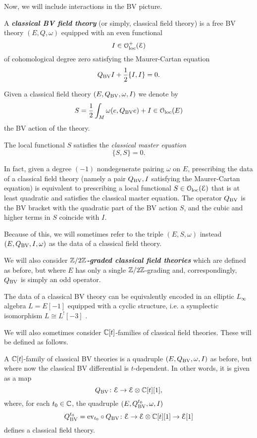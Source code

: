 \documentclass[10pt, oneside]{article}
\newcommand{\defterm}[1]{\textbf{\emph{#1}}}
\begin{document}

Now, we will include interactions in the BV picture. 

\begin{definition}
A \defterm{classical BV field theory} (or simply, classical field theory) is a free BV theory $(E, Q, \omega)$ equipped with an even functional
\[I \in \mathcal{O}_{\rm loc}^+(\mathcal E)\]
of cohomological degree zero satisfying the Maurer-Cartan equation
\[Q_{\mathrm{BV}} I + \frac{1}{2} \{I,I\} = 0 .\]
\label{def:classicalfieldtheory}
\end{definition}

Given a classical field theory $(E, Q_{\mathrm{BV}}, \omega, I)$ we denote by
\[S = \frac{1}{2} \int_M \omega(e, Q_{\mathrm{BV}} e) + I\in \mathcal{O}_{\rm loc}(E)\]
the BV action of the theory.

The local functional $S$ satisfies the {\em classical master equation} \[\{S, S\} = 0.\] 

In fact, given a degree $(-1)$ nondegenerate pairing $\omega$ on $E$, prescribing the data of a classical field theory (namely a pair $Q_{\mathrm{BV}}, I$ satisfying the Maurer-Cartan equation) is equivalent to prescribing a local functional $S \in \mathcal{O}_{\rm loc}(\mathcal E)$ that is at least quadratic and satisfies the classical master equation.
The operator $Q_{\mathrm{BV}}$ is the BV bracket with the quadratic part of the BV action $S$, and the cubic and higher terms in $S$ coincide with $I$.

Because of this, we will sometimes refer to the triple $(E, S, \omega)$ instead $(E, Q_{\mathrm{BV}}, I, \omega)$ as the data of a classical field theory.

\begin{remark}
We will also consider \defterm{$\mathbb Z/2\mathbb Z$-graded classical field theories} which are defined as before, but where $E$ has only a single $\mathbb Z/2\mathbb Z$-grading and, correspondingly, $Q_{\mathrm{BV}}$ is simply an odd operator.
\end{remark}

\begin{remark}
The data of a classical BV theory can be equivalently encoded in an elliptic $L_\infty$ algebra $L=E[-1]$ equipped with a cyclic structure, i.e. a symplectic isomorphism $L\cong L^![-3]$ \cite[Chapter 5.4]{Book2}. 
\end{remark}

We will also sometimes consider $\mathbb C[t]$-families of classical field theories.  These will be defined as follows.
\begin{definition} \label{family_of_BV_theories_def}
A $\mathbb C[t]$-family of classical BV theories is a quadruple $(E,Q_{\mathrm{BV}}, \omega, I)$ as before, but where now the classical BV differential is $t$-dependent.  In other words, it is given as a map
\[Q_{\mathrm{BV}} \colon \mathcal E \to \mathcal E  \otimes \mathbb C[t] [1],\]
where, for each $t_0 \in \mathbb C$, the quadruple $(E,Q^{t_0}_{\mathrm{BV}}, \omega, I)$
\[Q^{t_0}_{\mathrm{BV}} = \mathrm{ev}_{t_0} \circ Q_{\mathrm{BV}} \colon \mathcal E \to \mathcal E  \otimes \mathbb C[t] [1] \to \mathcal E[1]\]
defines a classical field theory.
\end{definition}
\end{document}
